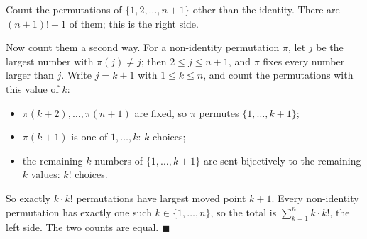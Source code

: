 Count the permutations of $\{1,2,\dots,n+1\}$ other than the identity. There are $(n+1)!-1$ of them; this is the right side.

Now count them a second way. For a non-identity permutation $\pi$, let $j$ be the largest number with $\pi(j)\ne j$; then $2\le j\le n+1$, and $\pi$ fixes every number larger than $j$. Write $j=k+1$ with $1\le k\le n$, and count the permutations with this value of $k$:
\begin{itemize}
\item $\pi(k+2),\dots,\pi(n+1)$ are fixed, so $\pi$ permutes $\{1,\dots,k+1\}$;
\item $\pi(k+1)$ is one of $1,\dots,k$: $k$ choices;
\item the remaining $k$ numbers of $\{1,\dots,k+1\}$ are sent bijectively to the remaining $k$ values: $k!$ choices.
\end{itemize}
So exactly $k\cdot k!$ permutations have largest moved point $k+1$. Every non-identity permutation has exactly one such $k\in\{1,\dots,n\}$, so the total is $\sum_{k=1}^{n}k\cdot k!$, the left side. The two counts are equal. $\blacksquare$
